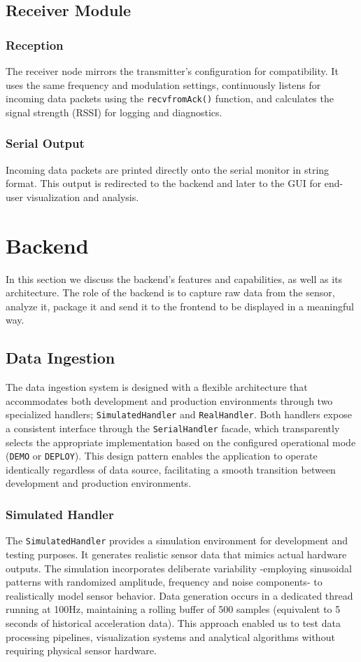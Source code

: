 \documentclass{article}
\begin{document}
\subsection{Receiver Module}
    \subsubsection{Reception}
    The receiver node mirrors the transmitter's configuration for compatibility. It uses the same frequency and modulation settings, continuously listens for incoming data packets using the \texttt{recvfromAck()} function, and calculates the signal strength (RSSI) for logging and diagnostics.
    
    \subsubsection{Serial Output}
    Incoming data packets are printed directly onto the serial monitor in string format. This output is redirected to the backend and later to the GUI for end-user visualization and analysis.

\newpage
\section{Backend}
In this section we discuss the backend's features and capabilities, as well as its architecture. The role of the backend is to capture raw data from the sensor, analyze it, package it and send it to the frontend to be displayed in a meaningful way.

\subsection{Data Ingestion}
The data ingestion system is designed with a flexible architecture that accommodates both development and production environments through two specialized handlers; \texttt{SimulatedHandler} and \texttt{RealHandler}. Both handlers expose a consistent interface through the \texttt{SerialHandler} facade, which transparently selects the appropriate implementation based on the configured operational mode (\texttt{DEMO} or \texttt{DEPLOY}). This design pattern enables the application to operate identically regardless of data source, facilitating a smooth transition between development and production environments.

    \subsubsection{Simulated Handler}
    The \texttt{SimulatedHandler} provides a simulation environment for development and testing purposes. It generates realistic sensor data that mimics actual hardware outputs. The simulation incorporates deliberate variability -employing sinusoidal patterns with randomized amplitude, frequency and noise components- to realistically model sensor behavior. Data generation occurs in a dedicated thread running at 100Hz, maintaining a rolling buffer of 500 samples (equivalent to 5 seconds of historical acceleration data). This approach enabled us to test data processing pipelines, visualization systems and analytical algorithms without requiring physical sensor hardware.
    
\end{document}

